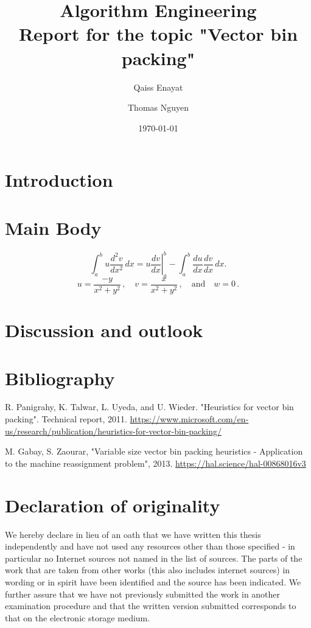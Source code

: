 \documentclass[a4paper,11pt,titlepage]{article}
\begin{document}
\begin{titlepage}
    \title{Algorithm Engineering\\Report for the topic "Vector bin packing"}
    \author{Qaiss Enayat \and Thomas Nguyen}
    \date{\today}
\end{titlepage}
\maketitle
\tableofcontents
\pagebreak
\section{Introduction}
\cite{heuristicsvbp}
\lipsum[1-5]
\section{Main Body}
\lipsum[5-7]
\[
\int_a^bu\frac{d^2v}{dx^2}\,dx
=\left.u\frac{dv}{dx}\right|_a^b
-\int_a^b\frac{du}{dx}\frac{dv}{dx}\,dx.
\]
\lipsum[8]
\[
u=\frac{-y}{x^2+y^2}\,,\quad
v=\frac{x}{x^2+y^2}\,,\quad\text{and}\quad
w=0\,.
\]
\lipsum[1-3]
\section{Discussion and outlook}
\lipsum[1-4]
\section{Bibliography}
\begin{thebibliography}{2}
    R. Panigrahy, K. Talwar, L. Uyeda, and U. Wieder. "Heuristics for vector bin packing". Technical report, 2011. \url{https://www.microsoft.com/en-us/research/publication/heuristics-for-vector-bin-packing/}

    M. Gabay, S. Zaourar, "Variable size vector bin packing heuristics - Application to the machine reassignment problem", 2013. \url{https://hal.science/hal-00868016v3} 
\end{thebibliography}
\section{Declaration of originality}
We hereby declare in lieu of an oath that we have written this thesis independently and have not used any resources other than those specified - in particular no Internet sources not named in the list of sources. The parts of the work that are taken from other works (this also includes internet sources) in wording or in spirit have been identified and the source has been indicated. We further assure that we have not previously submitted the work in another examination procedure and that the written version submitted corresponds to that on the electronic storage medium.
\end{document}
